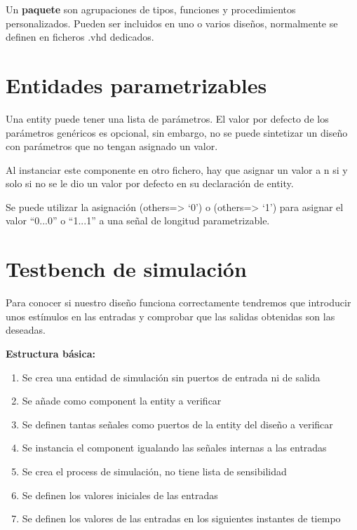 \begin{figure}[H]
	\centering
	
\end{figure}

Un \textbf{paquete} son agrupaciones de tipos, funciones y procedimientos personalizados. Pueden ser incluidos en uno o varios diseños, normalmente se definen en ficheros .vhd dedicados.

\begin{figure}[H]
	\centering
	
\end{figure}

\section{Entidades parametrizables}
Una entity puede tener una lista de parámetros. El valor por defecto de los parámetros genéricos es opcional, sin embargo, no se puede sintetizar un diseño con parámetros que no tengan asignado un valor.

Al instanciar este componente en otro fichero, hay que asignar un valor a n si y solo si no se le dio un valor por defecto en su declaración de entity.

Se  puede  utilizar  la  asignación (others=> ‘0’) o (others=> ‘1’) para asignar el valor “0...0” o “1...1” a una señal de longitud parametrizable.

\section{Testbench de simulación}
Para conocer si nuestro diseño funciona correctamente tendremos que introducir unos estímulos en las entradas y comprobar que las salidas obtenidas son las deseadas.

\textbf{Estructura básica:}
\begin{enumerate}
	\item Se crea una entidad de simulación sin puertos de entrada ni de salida
	\item Se añade como component la entity a verificar
	\item Se definen tantas señales como puertos de la entity del diseño a verificar
	\item Se instancia el component igualando las señales internas a las entradas
	\item Se crea el process de simulación, no tiene lista de sensibilidad
	\item Se definen los valores iniciales de las entradas
	\item Se definen los valores de las entradas en los siguientes instantes de tiempo
\end{enumerate}

